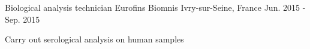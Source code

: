 \begin{cventries}
  \cventry
    {Biological analysis technician} %
    {Eurofins Biomnis} %
    {Ivry-sur-Seine, France} %
    {Jun. 2015 - Sep. 2015} %
    {
      \begin{cvitems} %
        \item {Carry out serological analysis on human samples}
      \end{cvitems}
    }
  \cventry
    { } %
    { } %
    { } %
    { } %
    { }
  \cventry
    { } %
    { } %
    { } %
    { } %
    { }

  \cventry
    { } %
    { } %
    { } %
    { } %
    { }

\end{cventries}
